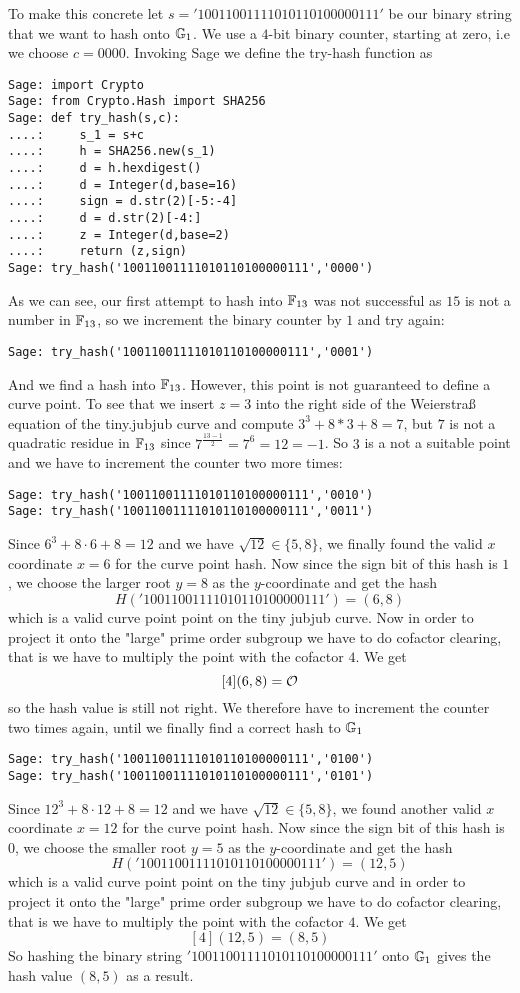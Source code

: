\begin{example}
To make this concrete let $s='10011001111010110100000111'$ be our binary string that we want to hash onto $\mathbb{G}_1$. We use a $4$-bit binary counter, starting at zero, i.e we choose $c=0000$. Invoking Sage we define the try-hash function as
\begin{verbatim}
Sage: import Crypto
Sage: from Crypto.Hash import SHA256
Sage: def try_hash(s,c):
....:     s_1 = s+c
....:     h = SHA256.new(s_1)
....:     d = h.hexdigest()
....:     d = Integer(d,base=16)
....:     sign = d.str(2)[-5:-4]
....:     d = d.str(2)[-4:]
....:     z = Integer(d,base=2)
....:     return (z,sign)
Sage: try_hash('10011001111010110100000111','0000')
\end{verbatim}
As we can see, our first attempt to hash into $\mathbb{F}_{13}$ was not successful as $15$ is not a number in $\mathbb{F}_{13}$, so we increment the binary counter by $1$ and try again: 
\begin{verbatim}
Sage: try_hash('10011001111010110100000111','0001')
\end{verbatim}
And we find a hash into $\mathbb{F}_{13}$. However, this point is not guaranteed to define a curve point. To see that we insert $z=3$ into the right side of the Weierstraß equation of the tiny.jubjub curve and compute $3^3 + 8*3 + 8 = 7$, but $7$ is not a quadratic residue in $\mathbb{F}_{13}$ since $7^{\frac{13-1}{2}}=7^6=12=-1$. So $3$ is a not a suitable point and we have to increment the counter two more times: 
\begin{verbatim}
Sage: try_hash('10011001111010110100000111','0010')
Sage: try_hash('10011001111010110100000111','0011')
\end{verbatim}
Since $6^3 + 8\cdot 6 + 8 = 12$ and we have $\sqrt{12}\in\{5, 8\}$, we finally found the valid $x$ coordinate $x=6$ for the curve point hash. Now since the sign bit of this hash is $1$, we choose the larger root $y=8$ as the $y$-coordinate and get the hash 
$$
H('10011001111010110100000111') = (6,8)
$$
which is a valid curve point point on the tiny jubjub curve. Now in order to project it onto the "large" prime order subgroup we have to do cofactor clearing, that is we have to multiply the point with the cofactor $4$. We get
$$
[4](6,8) = \mathcal{O}
$$ 
so the hash value is still not right. We therefore have to increment the counter two times again, until we finally find a correct hash to $\mathbb{G}_1$ 
\begin{verbatim}
Sage: try_hash('10011001111010110100000111','0100')
Sage: try_hash('10011001111010110100000111','0101')
\end{verbatim}
Since $12^3 + 8\cdot 12 + 8 = 12$ and we have $\sqrt{12}\in\{5, 8\}$, we found another valid $x$ coordinate $x=12$ for the curve point hash. Now since the sign bit of this hash is $0$, we choose the smaller root $y=5$ as the $y$-coordinate and get the hash 
$$
H('10011001111010110100000111') = (12,5)
$$
which is a valid curve point point on the tiny jubjub curve and in order to project it onto the "large" prime order subgroup we have to do cofactor clearing, that is we have to multiply the point with the cofactor $4$. We get
$$
[4](12,5) = (8,5)
$$
So hashing the binary string $'10011001111010110100000111'$ onto $\mathbb{G}_1$ gives the hash value $(8,5)$ as a result. 
\end{example}

